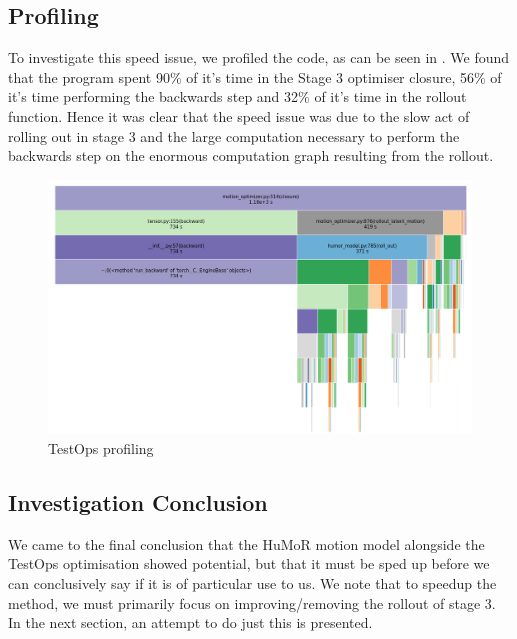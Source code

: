 \subsection{Profiling}
To investigate this speed issue, we profiled the code, as can be seen in . We found that the program spent 90\% of it's time in the Stage 3 optimiser closure, 56\% of it's time performing the backwards step and 32\% of it's time in the rollout function. Hence it was clear that the speed issue was due to the slow act of rolling out in stage 3 and the large computation necessary to perform the backwards step on the enormous computation graph resulting from the rollout.

\begin{figure}[!ht]
    \centering
    \includegraphics[width=1\textwidth]{Figures/humor/profiling/profiling.png}
    \caption{TestOps profiling}
    \label{fig:humor_profiling}
\end{figure}

\subsection{Investigation Conclusion}
We came to the final conclusion that the HuMoR motion model alongside the TestOps optimisation showed potential, but that it must be sped up before we can conclusively say if it is of particular use to us. We note that to speedup the method, we must primarily focus on improving/removing the rollout of stage 3. In the next section, an attempt to do just this is presented.

